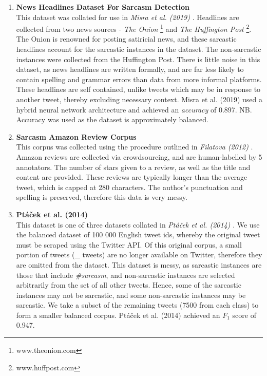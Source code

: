 \documentclass[12pt,a4paper]{article}
\begin{document}
\begin{enumerate}
	\item \textbf{News Headlines Dataset For Sarcasm Detection}\\ This dataset was collated for use in  \textit{Misra et al. (2019)} \cite{misra2019sarcasm}. Headlines are collected from two news sources - \textit{The Onion} \footnote{www.theonion.com} and \textit{The Huffington Post} \footnote{www.huffpost.com}. The Onion is renowned for posting satiricial news, and these sarcastic headlines account for the sarcastic instances in the dataset. The non-sarcastic instances were collected from the Huffington Post. There is little noise in this dataset, as news headlines are written formally, and are far less likely to contain spelling and grammar errors than data from more informal platforms. These headlines are self contained, unlike tweets which may be in response to another tweet, thereby excluding necessary context. Misra et al. (2019) \cite{misra2019sarcasm} used a hybrid neural network architecture and achieved an \textit{accuracy} of 0.897. NB. Accuracy was used as the dataset is approximately balanced.
	
	
	\item \textbf{Sarcasm Amazon Review Corpus}\\ This corpus was collected using the procedure outlined in \textit{Filatova (2012)} \cite{filatova2012irony}. Amazon reviews are collected via crowdsourcing, and are human-labelled by 5 annotators. The number of stars given to a review, as well as the title and content are provided. These reviews are typically longer than the average tweet, which is capped at 280 characters. The author's punctuation and spelling is preserved, therefore this data is very messy.
	
	\item \textbf{Pt\'a\v{c}ek et al. (2014)}\\ This dataset is one of three datasets collated in \textit{Pt\'a\v{c}ek et al. (2014)} \cite{ptavcek2014sarcasm}. We use the balanced dataset of 100 000 English tweet ids, whereby the original tweet must be scraped using the Twitter API. Of this original corpus, a small portion of tweets (\_ tweets) are no longer available on Twitter, therefore they are omitted from the dataset. This dataset is messy, as sarcastic instances are those that include \textit{\#sarcasm}, and non-sarcastic instances are selected arbitrarily from the set of all other tweets. Hence, some of the sarcastic instances may not be sarcastic, and some non-sarcastic instances may be sarcastic. We take a subset of the remaining tweets (7500 from each class) to form a smaller balanced corpus. Pt\'a\v{c}ek et al. (2014) \cite{ptavcek2014sarcasm} achieved an $F_{1}$ score of 0.947.
\end{enumerate}
\end{document}
